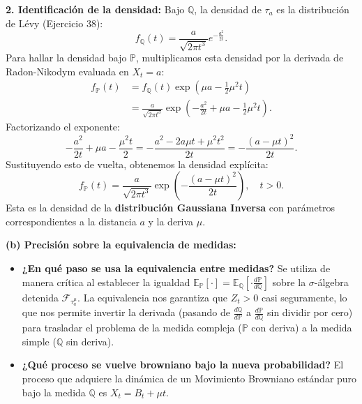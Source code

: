 \documentclass[11pt, letterpaper]{article}
\begin{document}
\begin{solucion}
    \textbf{2. Identificación de la densidad:}
    Bajo $\mathbb{Q}$, la densidad de $\tau_a$ es la distribución de Lévy (Ejercicio 38):
    \[ f_{\mathbb{Q}}(t) = \frac{a}{\sqrt{2\pi t^3}} e^{-\frac{a^2}{2t}}. \]
    Para hallar la densidad bajo $\mathbb{P}$, multiplicamos esta densidad por la derivada de Radon-Nikodym evaluada en $X_t = a$:
    \begin{align*}
        f_{\mathbb{P}}(t) &= f_{\mathbb{Q}}(t) \exp\left( \mu a - \frac{1}{2}\mu^2 t \right) \\
        &= \frac{a}{\sqrt{2\pi t^3}} \exp\left( -\frac{a^2}{2t} + \mu a - \frac{1}{2}\mu^2 t \right).
    \end{align*}
    Factorizando el exponente:
    \[ -\frac{a^2}{2t} + \mu a - \frac{\mu^2 t}{2} = -\frac{a^2 - 2a\mu t + \mu^2 t^2}{2t} = -\frac{(a - \mu t)^2}{2t}. \]
    Sustituyendo esto de vuelta, obtenemos la densidad explícita:
    \[ f_{\mathbb{P}}(t) = \frac{a}{\sqrt{2\pi t^3}} \exp\left( -\frac{(a - \mu t)^2}{2t} \right), \quad t > 0. \]
    Esta es la densidad de la \textbf{distribución Gaussiana Inversa} con parámetros correspondientes a la distancia $a$ y la deriva $\mu$.

    \vspace{3mm}
    \textbf{(b) Precisión sobre la equivalencia de medidas:}
    \begin{itemize}
        \item \textbf{¿En qué paso se usa la equivalencia entre medidas?} Se utiliza de manera crítica al establecer la igualdad $\mathbb{E}_{\mathbb{P}}[\cdot] = \mathbb{E}_{\mathbb{Q}}[\cdot \frac{d\mathbb{P}}{d\mathbb{Q}}]$ sobre la $\sigma$-álgebra detenida $\mathcal{F}_{\tau_a^\mu}$. La equivalencia nos garantiza que $Z_t > 0$ casi seguramente, lo que nos permite invertir la derivada (pasando de $\frac{d\mathbb{Q}}{d\mathbb{P}}$ a $\frac{d\mathbb{P}}{d\mathbb{Q}}$ sin dividir por cero) para trasladar el problema de la medida compleja ($\mathbb{P}$ con deriva) a la medida simple ($\mathbb{Q}$ sin deriva).
        \item \textbf{¿Qué proceso se vuelve browniano bajo la nueva probabilidad?} El proceso que adquiere la dinámica de un Movimiento Browniano estándar puro bajo la medida $\mathbb{Q}$ es $X_t = B_t + \mu t$.
    \end{itemize}
\end{solucion}

\newpage
\end{document}
